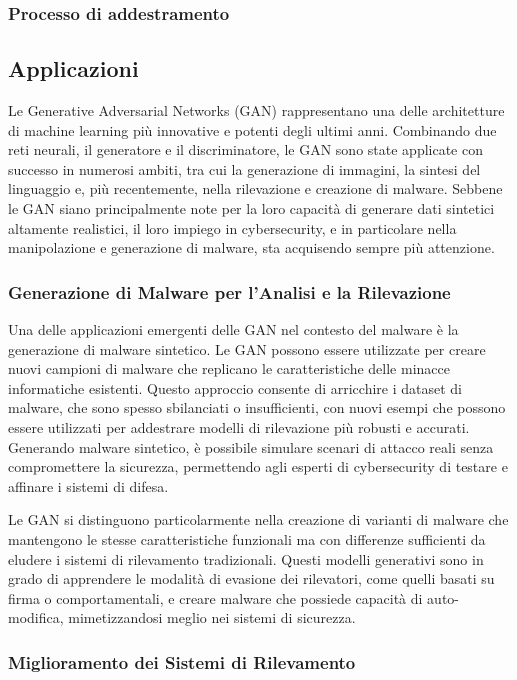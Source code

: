 \subsubsection{Processo di addestramento}

\subsection{Applicazioni}
Le Generative Adversarial Networks (GAN) rappresentano una delle architetture di machine learning più innovative e potenti degli ultimi anni. Combinando due reti neurali, il generatore e il discriminatore, le GAN sono state applicate con successo in numerosi ambiti, tra cui la generazione di immagini, la sintesi del linguaggio e, più recentemente, nella rilevazione e creazione di malware. Sebbene le GAN siano principalmente note per la loro capacità di generare dati sintetici altamente realistici, il loro impiego in cybersecurity, e in particolare nella manipolazione e generazione di malware, sta acquisendo sempre più attenzione.

\subsubsection{Generazione di Malware per l'Analisi e la Rilevazione}

Una delle applicazioni emergenti delle GAN nel contesto del malware è la generazione di malware sintetico. Le GAN possono essere utilizzate per creare nuovi campioni di malware che replicano le caratteristiche delle minacce informatiche esistenti. Questo approccio consente di arricchire i dataset di malware, che sono spesso sbilanciati o insufficienti, con nuovi esempi che possono essere utilizzati per addestrare modelli di rilevazione più robusti e accurati. Generando malware sintetico, è possibile simulare scenari di attacco reali senza compromettere la sicurezza, permettendo agli esperti di cybersecurity di testare e affinare i sistemi di difesa.

Le GAN si distinguono particolarmente nella creazione di varianti di malware che mantengono le stesse caratteristiche funzionali ma con differenze sufficienti da eludere i sistemi di rilevamento tradizionali. Questi modelli generativi sono in grado di apprendere le modalità di evasione dei rilevatori, come quelli basati su firma o comportamentali, e creare malware che possiede capacità di auto-modifica, mimetizzandosi meglio nei sistemi di sicurezza.

\subsubsection{Miglioramento dei Sistemi di Rilevamento}

